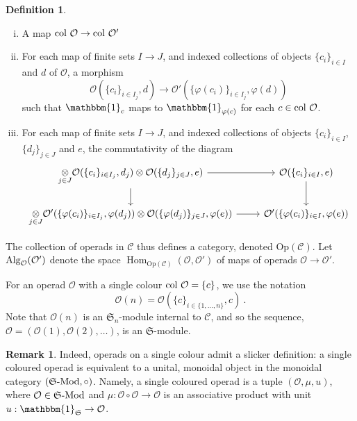 \documentclass[11pt]{amsart}
\numberwithin{equation}{section}
\theoremstyle{definition}
\newtheorem{defn}[theo]{Definition}
\newtheorem{rmk}[theo]{Remark}
\newcommand{\bb}{\mathbb}
\newcommand{\mc}{\mathcal}
\newcommand{\mf}{\mathfrak}
\DeclareMathOperator{\Hom}{Hom}
\newcommand{\Mod}{{\textup{-Mod}}}
\newcommand{\K}{{\bb K}}
\newcommand{\Alg}{{\textup{Alg}}}
\newcommand{\col}{{{\textup{col }}}}
\newcommand{\Op}{{\textup{Op}}}
\newcommand{\Ss}{{{\mf{S}}}}
\newcommand{\0}{{\textbf{0}}}
\newcommand{\id}{{\textup{id}}}
\def\OO{{\mc O}}
\def \mf{\mathfrak}
\def \id{\mathbbm{1}}
\def \Op{\mathrm{Op}}
\newcommand{\tensor}[1]{\underset{#1}{\otimes}}
\begin{document}
\begin{defn}
\begin{enumerate}[(i)]
		\item A map $\col\mc O \to \col \mc O'$
		\item For each map of finite sets $I\to J$, and indexed collections of objects $\{c_i\}_{i\in I}$ and $d$ of $\mc O$, a morphism
		$$ \mc O(\{c_i\}_{i\in I_j}, d) \to \mc O'(\{\varphi(c_i)\}_{i\in I_j}, \varphi(d))$$ 
		such that $\id_c$ maps to $\id_{\varphi(c)}$ for each $c\in \col \mc O$.
		\item For each map of finite sets $I\to J$, and indexed collections of objects $\{c_i\}_{i\in I}$, $\{d_j\}_{j\in J}$ and $e$, the commutativity of the diagram
		\[
			\begin{tikzcd}
				\tensor{j\in J} \mc O(\{c_i\}_{i\in I_j}, d_j)\otimes \mc O(\{d_j\}_{j\in J},e) \ar[r] \ar[d] & \mc O(\{c_i\}_{i\in I},e) \ar[d] \\
				\tensor{j\in J} \mc O'(\{\varphi(c_i)\}_{i\in I_j}, \varphi(d_j))\otimes \mc O(\{\varphi(d_j)\}_{j\in J},\varphi(e)) \ar[r] & \mc O'(\{\varphi(c_i)\}_{i\in I},\varphi(e)) 
			\end{tikzcd}
		\]
	\end{enumerate}
	
	The collection of operads in $\mc C$ thus defines a category, denoted $\Op(\mc C)$. Let $\Alg_{\mc O}(\mc O')$ denote the space $\Hom_{\Op(\mc C)}(\mc O,\mc O')$ of maps of operads $\mc O\to \mc O'$.
	
\end{defn}

For an operad $\mc O$ with a single colour $\col \mc O=\{c\}$, we use the notation 
\[
\mc O(n)=\mc O(\{c\}_{i\in\{1,\dots,n\}},c)~.
\]
Note that $\mc O(n)$ is an $\Ss_n$-module internal to $\mc C$, and so the sequence, $\OO = (\OO(1),\OO(2),\dots)$, is an $\Ss$-module. 

\begin{rmk}\label{opsingcolrmk} 
Indeed, operads on a single colour admit a slicker definition: a single coloured operad is equivalent to a unital, monoidal object in the monoidal category $(\Ss\Mod,\circ)$. Namely, a single coloured operad is a tuple $(\OO, \mu, u)$, where $\OO \in \Ss\Mod$ and $\mu:\OO\circ \OO\rightarrow \OO$ is an associative product with unit $u:\id_\Ss\rightarrow \OO$.
\end{rmk}
\end{document}
